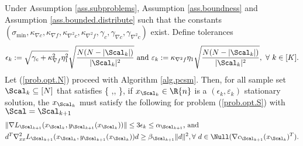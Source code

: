 %	

\begin{theorem}
\label{theo.2}
Under Assumption \ref{ass.subproblems}, Assumption \ref{ass.boundness} and Assumption \ref{ass.bounded.distribute} such that the constants $(\sigma_{\min}, \kappa_{\nabla c},\kappa_{\nabla f},\kappa_{\nabla^2 c},\kappa_{\nabla^2 f},\gamma_c,\gamma_{\nabla c},\gamma_{\nabla^2 c} )$ exist.  Define tolerances 
\[
\epsilon_k:=\sqrt{\gamma_{c}+\kappa_{\nabla f}^2\eta_1^2}\sqrt{\frac{N(N-|\Scal_k|)}{|\Scal_k|^2}}\text{ and }\varepsilon_k:= \kappa_{\nabla^2f}\eta_1\sqrt{\frac{N(N-|\Scal_k|)}{|\Scal_k|^2}},\ \forall\ k\in[K].
\]
Let (\ref{prob.opt.N}) proceed with Algorithm \ref{alg.pcsm}. Then, for all sample set $\Scal_k\subseteq[N]$ that satisfies
\bequation
\label{eq.theorem2.S}
\le
\min\left\{
,,
\right\},
\eequation
if $x_{\Scal_k}\in\R{n}$ is a $(\epsilon_k,\varepsilon_k)$ stationary solution, the $x_{\Scal_k}$ must satisfy the following for problem (\ref{prob.opt.S}) with $\Scal=\Scal_{k+1}$
\begin{align*}
	&\|\nabla L_{\Scal_{k+1}}(x_{\Scal_{k}},y_{\Scal_{k+1}}(x_{\Scal_k}))\|\le3\epsilon_k\le\alpha_{\Scal_{k+1}}\text{, and }\\
	& d^T\nabla^2_{xx}L_{\Scal_{k+1}}(x_{\Scal_{k}},y_{\Scal_{k+1}}(x_{\Scal_k}))d\ge \beta_{\Scal_{k+1}}\|d\|^2,\forall \ d\in\Null(\nabla c_{\Scal_{k+1}}(x_{\Scal_k})^T).
\end{align*}
\end{theorem}

